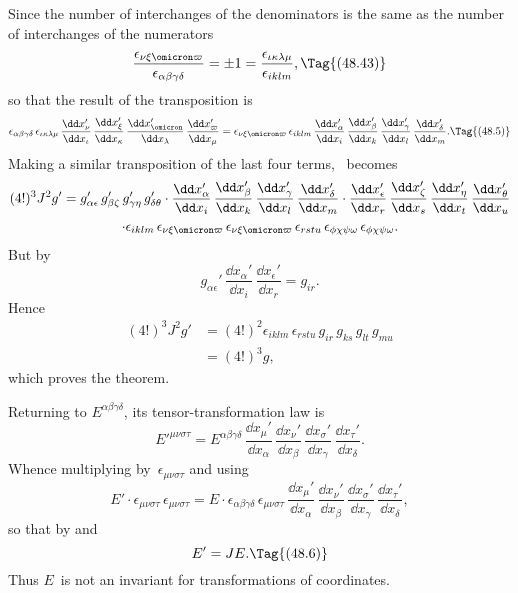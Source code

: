 \documentclass[12pt]{book}
\begin{document}
Since the number of interchanges of the denominators is the same as the
number of interchanges of the numerators
\[
\frac{\epsilon_{\nu\xi\omicron\varpi}}{\epsilon_{\alpha\beta\gamma\delta}}
= \pm1 = \frac{\epsilon_{\iota\kappa\lambda\mu}}{\epsilon_{iklm}},
\Tag{(48.43)}
\]
so that the result of the transposition is
\[
  \epsilon_{\alpha\beta\gamma\delta}\, \epsilon_{\iota\kappa\lambda\mu}\,
  \frac{\dd x_{\nu}'}{\dd x_{\iota}}\,
  \frac{\dd x_{\xi}'}{\dd x_{\kappa}}\,
  \frac{\dd x_{\omicron}'}{\dd x_{\lambda}}\,
  \frac{\dd x_{\varpi}'}{\dd x_{\mu}}
  = \epsilon_{\nu\xi\omicron\varpi}\, \epsilon_{iklm}\,
  \frac{\dd x_{\alpha}'}{\dd x_{i}}\,
  \frac{\dd x_{\beta}'}{\dd x_{k}}\,
  \frac{\dd x_{\gamma}'}{\dd x_{l}}\,
  \frac{\dd x_{\delta}'}{\dd x_{m}}.
  \Tag{(48.5)}
\]
Making a similar transposition of the last four terms, ~becomes
\begin{multline*}
  (4!)^{3} J^{2} g'
  = g_{\alpha\epsilon}'\, g_{\beta\zeta}'\, g_{\gamma\eta}'\, g_{\delta\theta}'
  \cdot \frac{\dd x_{\alpha}'}{\dd x_{i}}\,
  \frac{\dd x_{\beta}'}{\dd x_{k}}\,
  \frac{\dd x_{\gamma}'}{\dd x_{l}}\,
  \frac{\dd x_{\delta}'}{\dd x_{m}}
  \cdot \frac{\dd x_{\epsilon}'}{\dd x_{r}}\,
  \frac{\dd x_{\zeta}'}{\dd x_{s}}\,
  \frac{\dd x_{\eta}'}{\dd x_{t}}\,
  \frac{\dd x_{\theta}'}{\dd x_{u}} \\
  \cdot \epsilon_{iklm}\, \epsilon_{\nu\xi\omicron\varpi}\, \epsilon_{\nu\xi\omicron\varpi}\,
  \epsilon_{rstu}\, \epsilon_{\phi\chi\psi\omega}\, \epsilon_{\phi\chi\psi\omega}.
\end{multline*}
But by~
\[
g_{\alpha\epsilon}'\, \frac{\dd x_{\alpha}'}{\dd x_{i}}\, \frac{\dd x_{\epsilon}'}{\dd x_{r}}
= g_{ir}.
\]
Hence
\begin{align*}
  (4!)^{3} J^{2} g'
  &= (4!)^{2} \epsilon_{iklm}\, \epsilon_{rstu}\, g_{ir}\, g_{ks}\, g_{lt}\, g_{mu} \\
  &= (4!)^{3} g,
\end{align*}
which proves the theorem.

Returning to $E^{\alpha\beta\gamma\delta}$, its tensor\hyp{}transformation law is
\[
E'^{\mu\nu\sigma\tau} = E^{\alpha\beta\gamma\delta}\,
\frac{\dd x_{\mu}'}{\dd x_{\alpha}}\,
\frac{\dd x_{\nu}'}{\dd x_{\beta}}\,
\frac{\dd x_{\sigma}'}{\dd x_{\gamma}}\,
\frac{\dd x_{\tau}'}{\dd x_{\delta}}.
\]
Whence multiplying by~$\epsilon_{\mu\nu\sigma\tau}$ and using~
\[
E' \cdot \epsilon_{\mu\nu\sigma\tau}\, \epsilon_{\mu\nu\sigma\tau}
= E \cdot \epsilon_{\alpha\beta\gamma\delta}\, \epsilon_{\mu\nu\sigma\tau}\,
\frac{\dd x_{\mu}'}{\dd x_{\alpha}}\,
\frac{\dd x_{\nu}'}{\dd x_{\beta}}\,
\frac{\dd x_{\sigma}'}{\dd x_{\gamma}}\,
\frac{\dd x_{\tau}'}{\dd x_{\delta}},
\]
so that by  and~
\[
E' = JE.
\Tag{(48.6)}
\]
Thus $E$~is not an invariant for transformations of coordinates.
\end{document}
